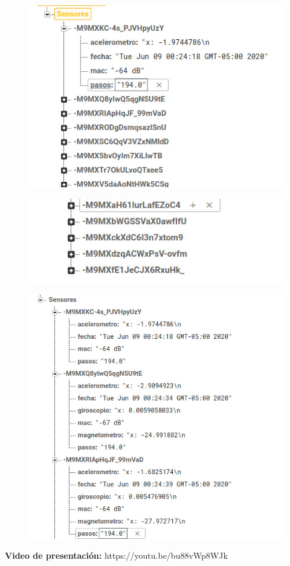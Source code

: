 \documentclass[conference,compsoc,onecolumn]{IEEEtran}
\begin{document}
\begin{figure}[H]
    \centering
    \includegraphics[scale=0.5]{bib/8.PNG}
    \label{fig:1}
\end{figure}

\begin{figure}[H]
    \centering
    \includegraphics[scale=0.5]{bib/9.PNG}
    \label{fig:1}
\end{figure}
\begin{figure}[H]
    \centering
    \includegraphics[scale=0.5]{bib/10.PNG}
    \label{fig:1}
\end{figure}


\textbf{Video de presentación:} https://youtu.be/bu88vWp8WJk


\nocite{*}

\label{sec:biblio}
 





\end{document}
